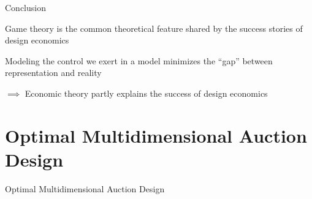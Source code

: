 \documentclass[aspectratio=169,xcolor=dvipsnames]{beamer}
\begin{document}



\begin{frame}{Conclusion}

\vspace{5mm}
Game theory is the common theoretical feature shared by the success stories of design economics

\vspace{5mm}
Modeling the control we exert in a model minimizes the ``gap'' between representation and reality

\vspace{5mm}
{\color{red}$\implies$ Economic theory partly explains the success of design economics}



\end{frame}



\section{Optimal Multidimensional Auction Design}


\begin{frame}

    \vspace{10mm}
    {\Large{\centerline{Optimal Multidimensional Auction Design}}}

\end{frame}

\end{document}
